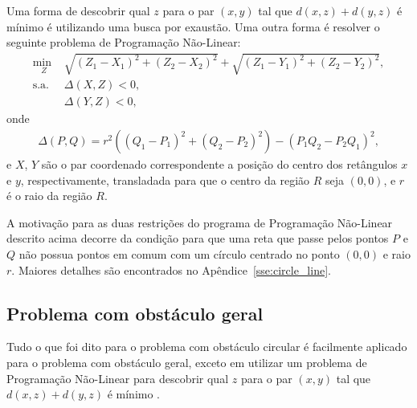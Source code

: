 Uma forma de descobrir qual $z$ para o par $(x, y)$ tal que $d(x, z) + d(y, z)$
é mínimo é utilizando uma busca por exaustão. Uma outra forma é resolver o
seguinte problema de Programação Não-Linear:
\begin{align*}
    \underset{Z}{\text{min }} & \sqrt{(Z_1 - X_1)^2 + (Z_2 - X_2)^2} +
    \sqrt{(Z_1 - Y_1)^2 + (Z_2 - Y_2)^2}, \\
    \text{s.a. } & \Delta(X, Z) < 0, \\
    & \Delta(Y, Z) < 0,
\end{align*}
onde
\begin{align*}
    \Delta(P, Q) = r^2 \left( (Q_1 - P_1)^2 + (Q_2 - P_2)^2 \right) - \left(
    P_1 Q_2 - P_2 Q_1 \right)^2,
\end{align*}
e $X$, $Y$ são o par coordenado correspondente a posição do centro dos
retângulos $x$ e $y$, respectivamente, transladada para que o centro da região
$R$ seja $(0, 0)$, e $r$ é o raio da região $R$.

A motivação para as duas restrições do programa de Programação Não-Linear
descrito acima decorre da condição para que uma reta que passe pelos pontos $P$
e $Q$ não possua pontos em comum com um círculo centrado no ponto $(0, 0)$ e
raio $r$. Maiores detalhes são encontrados no Apêndice~\ref{sse:circle_line}.

\subsection{Problema com obst\'{a}culo geral}
Tudo o que foi dito para o problema com obst\'{a}culo circular \'{e} facilmente
aplicado para o problema com obst\'{a}culo geral, exceto em utilizar um problema
de Programação Não-Linear para descobrir qual $z$ para o par $(x, y)$ tal que
$d(x, z) + d(y, z)$ é mínimo .
